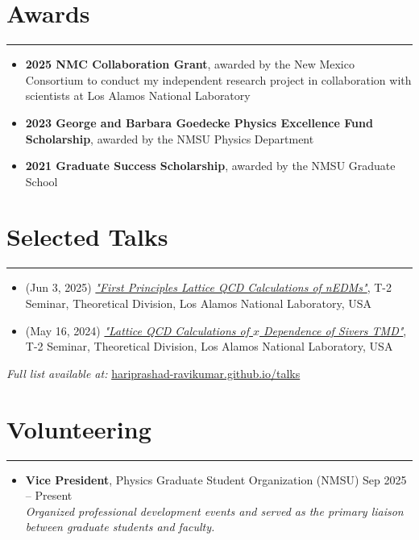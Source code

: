 \documentclass[11pt]{article}
\begin{document}
\section*{Awards}
\hrule
\vspace{-0.3em}

\begin{itemize}
    \item \textbf{2025 NMC Collaboration Grant}, awarded by the New Mexico Consortium to conduct my independent research project in collaboration with scientists at Los Alamos National Laboratory
    \vspace{-0.5em}
    \item \textbf{2023 George and Barbara Goedecke Physics Excellence Fund Scholarship}, awarded by the NMSU Physics Department
    \vspace{-0.5em}
    \item \textbf{2021 Graduate Success Scholarship}, awarded by the NMSU Graduate School
\end{itemize}

\section*{Selected Talks}
\hrule
\vspace{-0.3em}
\begin{itemize}
    \item (Jun 3, 2025) \href{https://hariprashad-ravikumar.github.io/talks/Los_Alamos_T2_talk_First_Principles_Lattice_QCD_Calculations_of_nEDMs__presentation_Hari_NMSU_June_03_2025.pdf}{\textit{"First Principles Lattice QCD Calculations of nEDMs"}}, T-2 Seminar, Theoretical Division, Los Alamos National Laboratory, USA

    
    \item (May 16, 2024) \href{https://hariprashad-ravikumar.github.io/talks/Lattice_QCD_calculations_of_Sivers_TMD_x_dependance____presentation_Hari__NMSU_May_16_2024.pdf}{\textit{"Lattice QCD Calculations of $x$ Dependence of Sivers TMD"}}, T-2 Seminar, Theoretical Division, Los Alamos National Laboratory, USA
    
\end{itemize}

\noindent\textit{Full list available at:} \href{https://hariprashad-ravikumar.github.io/talks}{hariprashad-ravikumar.github.io/talks}


\section*{Volunteering}
\hrule
\vspace{-0.3em}
\begin{itemize}
    \item \textbf{Vice President}, Physics Graduate Student Organization (NMSU)  \hfill Sep 2025 -- Present \\ \textit{Organized professional development events and served as the primary liaison between graduate students and faculty.}
    
\end{itemize}
\end{document}
